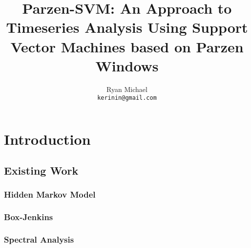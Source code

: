 \documentclass[10pt]{article}
\begin{document}
\title{Parzen-SVM: An Approach to Timeseries Analysis Using Support Vector Machines based on Parzen Windows}
\author{Ryan Michael\\ \texttt{kerinin@gmail.com}}
\maketitle

\begin{abstract}

\end{abstract}

\tableofcontents

\section{Introduction}

\subsection{Existing Work}


\subsubsection{Hidden Markov Model}

\subsubsection{Box-Jenkins}

\subsubsection{Spectral Analysis}
\end{document}
